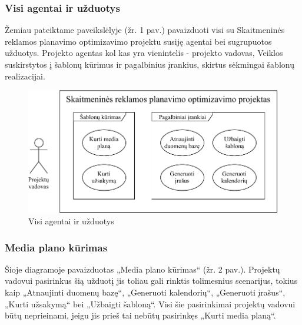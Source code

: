 \subsubsection {Visi agentai ir užduotys}
Žemiau pateiktame paveikslėlyje (žr. 1 pav.) pavaizduoti visi su Skaitmeninės reklamos planavimo optimizavimo projektu susiję agentai bei sugrupuotos užduotys. Projekto agentas kol kas yra vienintelis - projekto vadovas, Veiklos suskirstytos į šablonų kūrimus ir pagalbinius įrankius, skirtus sėkmingai šablonų realizacijai.

\begin{figure}[H]
    \centering
    \includegraphics[scale=0.9]{Images/agents-use-cases.pdf}
    \caption{Visi agentai ir užduotys}
    \label{img:model}
\end{figure}

\subsubsection {Media plano kūrimas}
Šioje diagramoje pavaizduotas „Media plano kūrimas“ (žr. 2 pav.). Projektų vadovui pasirinkus šią užduotį jis toliau gali rinktis tolimesnius scenarijus, tokius kaip „Atnaujinti duomenų bazę“, „Generuoti kalendorių“, „Generuoti įrašus“, „Kurti užsakymą“ bei „Užbaigti šabloną“. Visi šie pasirinkimai projektų vadovui būtų neprieinami, jeigu jis prieš tai nebūtų pasirinkęs „Kurti media planą“.

